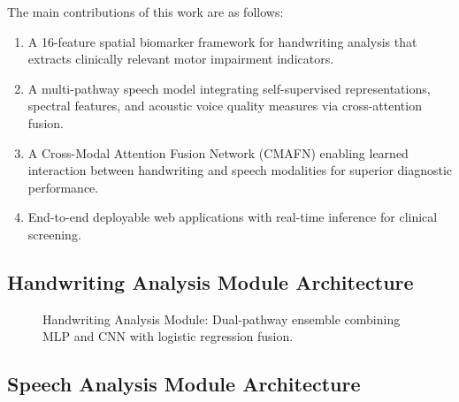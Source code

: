 \documentclass[10pt,conference,letterpaper]{IEEEtran}
\begin{document}
The main contributions of this work are as follows:
\begin{enumerate}
    \item A 16-feature spatial biomarker framework for handwriting analysis that extracts clinically relevant motor impairment indicators.
    \item A multi-pathway speech model integrating self-supervised representations, spectral features, and acoustic voice quality measures via cross-attention fusion.
    \item A Cross-Modal Attention Fusion Network (CMAFN) enabling learned interaction between handwriting and speech modalities for superior diagnostic performance.
    \item End-to-end deployable web applications with real-time inference for clinical screening.
\end{enumerate}

\subsection{Handwriting Analysis Module Architecture}

\begin{figure}[h]
\centering
{}
\caption{Handwriting Analysis Module: Dual-pathway ensemble combining MLP and CNN with logistic regression fusion.}
\label{fig:handwriting_arch}
\end{figure}

\subsection{Speech Analysis Module Architecture}
\end{document}
